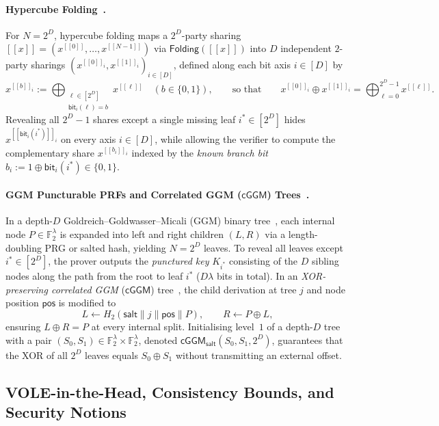 \documentclass[11pt,a4paper]{article}
\theoremstyle{definition}
\theoremstyle{remark}
\newcommand{\Ftwo}{\mathbb{F}_2}
\newcommand{\salt}{\mathsf{salt}}
\newcommand{\cGGM}{\mathsf{cGGM}}
\newcommand{\Folding}{\mathsf{Folding}}
\newcommand{\share}[1]{[\![#1]\!]}
\begin{document}
\paragraph{Hypercube Folding~\cite{AGHHJY23,HJ24}.}
For $N = 2^D$, hypercube folding maps a $2^D$-party sharing $\share{x} = (x^{\share{0}}, \dots, x^{\share{N-1}})$ via $\Folding(\share{x})$ into $D$ independent $2$-party sharings $(x^{\share{0}_i}, x^{\share{1}_i})_{i \in [D]}$, defined along each bit axis $i \in [D]$ by
\begin{equation}
\label{eq:folding-def}
x^{\share{b}_i} := \bigoplus_{\substack{\ell \in [2^D] \\ \mathsf{bit}_i(\ell) = b}} x^{\share{\ell}} \quad (b \in \{0, 1\}), \qquad \text{so that} \qquad x^{\share{0}_i} \oplus x^{\share{1}_i} = \bigoplus_{\ell=0}^{2^D-1} x^{\share{\ell}}.
\end{equation}
Revealing all $2^D - 1$ shares except a single missing leaf $i^* \in [2^D]$ hides $x^{\share{\mathsf{bit}_i(i^*)}_i}$ on every axis $i \in [D]$, while allowing the verifier to compute the complementary share $x^{\share{b_i}_i}$ indexed by the \emph{known branch bit} $b_i := 1 \oplus \mathsf{bit}_i(i^*) \in \{0, 1\}$.

\paragraph{GGM Puncturable PRFs and Correlated GGM ($\cGGM$) Trees~\cite{GGM86,GYW23,HJ25}.}
In a depth-$D$ Goldreich--Goldwasser--Micali (GGM) binary tree~\cite{GGM86}, each internal node $P \in \Ftwo^\lambda$ is expanded into left and right children $(L, R)$ via a length-doubling PRG or salted hash, yielding $N = 2^D$ leaves. To reveal all leaves except $i^* \in [2^D]$, the prover outputs the \emph{punctured key} $K_{i^*}$ consisting of the $D$ sibling nodes along the path from the root to leaf $i^*$ ($D\lambda$ bits in total). In an \emph{XOR-preserving correlated GGM} ($\cGGM$) tree~\cite{GYW23,HJ25}, the child derivation at tree $j$ and node position $\mathsf{pos}$ is modified to
\[
L \leftarrow H_2(\salt \parallel j \parallel \mathsf{pos} \parallel P), \qquad R \leftarrow P \oplus L,
\]
ensuring $L \oplus R = P$ at every internal split. Initialising level~$1$ of a depth-$D$ tree with a pair $(S_0, S_1) \in \Ftwo^\lambda \times \Ftwo^\lambda$, denoted $\cGGM_{\salt}(S_0, S_1, 2^D)$, guarantees that the XOR of all $2^D$ leaves equals $S_0 \oplus S_1$ without transmitting an external offset.

\subsection{VOLE-in-the-Head, Consistency Bounds, and Security Notions}
\label{subsec:prelim-vole}
\end{document}
